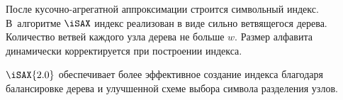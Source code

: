 \documentclass{.local/lib/classes/ndvr-super-article-standalone}
\begin{document}
    После кусочно-агрегатной аппроксимации 
    строится символьный индекс. 
    В~алгоритме $\iSAX$ индекс реализован 
    в виде сильно ветвящегося дерева. 
    Количество ветвей каждого узла дерева не больше $w$.
    Размер алфавита динамически корректируется 
    при построении индекса. 

    $\iSAX{2.0}$  обеспечивает более 
    эффективное создание индекса благодаря 
    балансировке дерева и улучшенной 
    схеме выбора символа разделения узлов.
        
\end{document}
